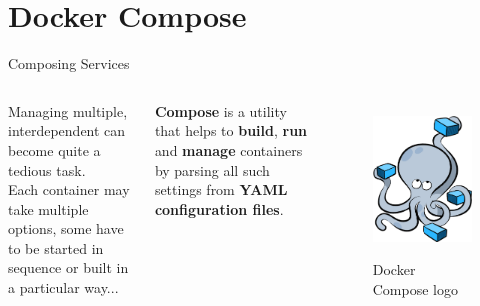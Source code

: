
\section{Docker Compose}
\graphicspath{{figs/section3/}}

\begin{frame}{Composing Services}
\begin{columns}
  Managing multiple, interdependent  can become quite a tedious task.\\
  Each container may take multiple options, some have to be started in sequence or built in a particular way...\\
  \begin{block}{}
    \centering
    \textbf{Compose} is a utility that helps to \textbf{build}, \textbf{run} and \textbf{manage} containers by parsing all such settings from \textbf{YAML configuration files}.
  \end{block}

  \begin{figure}
    \centering
    \includegraphics[scale=.2]{composeLogo.png}
    \label{fig:compose}
    \caption{Docker Compose logo}
  \end{figure}
\end{columns}
\end{frame}

